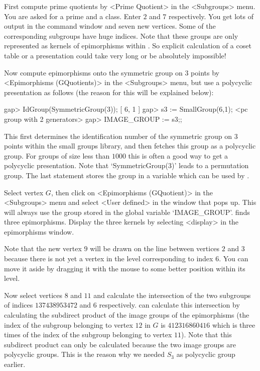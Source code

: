 First compute prime quotients by <Prime Quotient> in the <Subgroups>
menu. You are asked for a prime and a class. Enter $2$ and $7$
respectively. You get lots of output in the {\GAP} command window and
seven new vertices. Some of the corresponding subgroups have huge
indices. Note that these groups are only represented as kernels of
epimorphisms within {\GAP}. So explicit calculation of a coset table
or a presentation could take very long or be absolutely impossible!

Now compute epimorphisms onto the symmetric group on $3$ points by
<Epimorphisms (GQuotients)> in the <Subgroups> menu, but use a polycyclic 
presentation as follows (the reason for this will be explained below):

\begintt
gap> IdGroup(SymmetricGroup(3));
[ 6, 1 ]
gap> s3 := SmallGroup(6,1);
<pc group with 2 generators>
gap> IMAGE_GROUP := s3;;
\endtt

This first determines the identification number of the symmetric group 
on $3$ points within the small groups library, and then fetches this
group as a polycyclic group. For groups of size less than $1000$ this
is often a good way to get a polycyclic presentation. Note that
`SymmetricGroup(3)' leads to a permutation group. The last statement
stores the group in a variable which can be used by {\XGAP}. 

Select vertex $G$, then click on <Epimorphisms (GQuotient)> in the
<Subgroups> menu and select <User defined> in the window that pops up.
This will always use the group stored in the global variable
`IMAGE_GROUP'. {\GAP} finds three epimorphisms. Display the three
kernels by selecting <display> in the epimorphisms window.

Note that the new vertex $9$ will be drawn on the line between
vertices $2$ and $3$ because there is not yet a vertex in the level
corresponding to index 6. You can move it aside by dragging it with
the mouse to some better position within its level.

Now select vertices $8$ and $11$ and calculate the intersection of the 
two subgroups of indices $137438953472$ and $6$ respectively. {\GAP}
can calculate this intersection by calculating the subdirect product
of the image groups of the epimorphisms (the index of the subgroup
belonging to vertex $12$ in $G$ is $412316860416$ which is three times
of the index of the subgroup belonging to vertex $11$). Note that this 
subdirect product can only be calculated because the two image groups
are polycyclic groups. This is the reason why we needed $S_3$ as
polycyclic group earlier.

